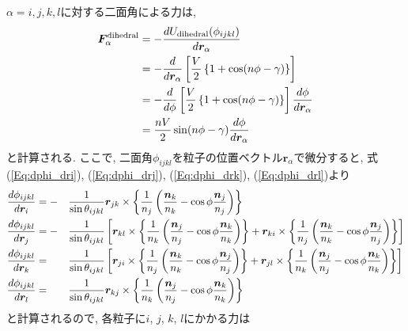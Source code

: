 $\alpha = i, j, k, l$に対する二面角による力は, 
\begin{align}
     \bm{F}_{\alpha}^{\mathrm{dihedral}}
 &=
   - \frac{d U_{\mathrm{dihedral}}(\phi_{ijkl})}{d \bm{r}_{\alpha}}
 \notag \\
 &=
   - \frac{d}{d \bm{r}_{\alpha}}
     \left[
            \frac{V}{2}
            \left\{ 1 + \cos(n\phi-\gamma) \right\}
     \right]
 \notag \\
 &=
   - \frac{d}{d \phi}
     \left[
            \frac{V}{2}
            \left\{ 1 + \cos(n\phi-\gamma) \right\}
     \right]
     \frac{d \phi}{d \bm{r}_{\alpha}}
 \notag \\
 &=
 \frac{nV}{2} \sin(n\phi - \gamma) \frac{d \phi}{d \bm{r}_{\alpha}}
 \notag
\end{align}
と計算される. ここで, 二面角$\phi_{ijkl}$を粒子の位置ベクトル$\bm{r}_{\alpha}$で微分すると,
式(\ref{Eq:dphi_dri}), (\ref{Eq:dphi_drj}), (\ref{Eq:dphi_drk}), (\ref{Eq:dphi_drl})より
\begin{alignat}{4}
   \frac{d \phi_{ijkl}}{d \bm{r}_{i}}
   &=
   -&&
   \frac{1}{\sin \theta_{ijkl}}
   \bm{r}_{jk} \times
   \left\{
          \frac{1}{n_{j}}
          \left(
                 \frac{\bm{n}_{k}}{n_{k}} - \cos\phi \frac{\bm{n}_{j}}{n_{j}}
          \right)
   \right\}
   \notag
   \\
   \frac{d \phi_{ijkl}}{d \bm{r}_{j}}
   &=
   -&&
   \frac{1}{\sin \theta_{ijkl}}
   \left[
      \bm{r}_{kl} \times
      \left\{
             \frac{1}{n_{k}}
             \left(
                    \frac{\bm{n}_{j}}{n_{j}} - \cos\phi \frac{\bm{n}_{k}}{n_{k}}
             \right)
      \right\}
    +
      \bm{r}_{ki} \times
      \left\{
             \frac{1}{n_{j}}
             \left(
                    \frac{\bm{n}_{k}}{n_{k}} - \cos\phi \frac{\bm{n}_{j}}{n_{j}}
             \right)
      \right\}
   \right]
   \notag
   \\
   \frac{d \phi_{ijkl}}{d \bm{r}_{k}}
   &=&&
   \frac{1}{\sin \theta_{ijkl}}
   \left[
      \bm{r}_{ji} \times
      \left\{
             \frac{1}{n_{j}}
             \left(
                    \frac{\bm{n}_{k}}{n_{k}} - \cos\phi \frac{\bm{n}_{j}}{n_{j}}
             \right)
      \right\}
    +
      \bm{r}_{jl} \times
      \left\{
             \frac{1}{n_{k}}
             \left(
                    \frac{\bm{n}_{j}}{n_{j}} - \cos\phi \frac{\bm{n}_{k}}{n_{k}}
             \right)
      \right\}
   \right]
   \notag
   \\
   \frac{d \phi_{ijkl}}{d \bm{r}_{l}}
   &=&&
   \frac{1}{\sin \theta_{ijkl}}
   \bm{r}_{kj} \times
   \left\{
          \frac{1}{n_{k}}
          \left(
                 \frac{\bm{n}_{j}}{n_{j}} - \cos\phi \frac{\bm{n}_{k}}{n_{k}}
          \right)
   \right\}
   \notag
\end{alignat}
と計算されるので, 各粒子に$i$, $j$, $k$, $l$にかかる力は

